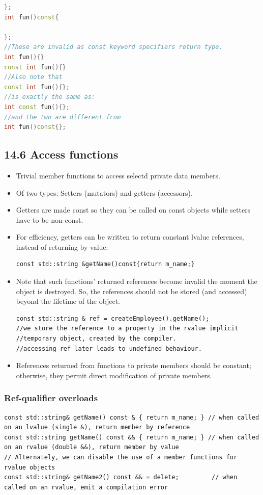 \documentclass{report}
\begin{document}
\begin{itemize}
\begin{lstlisting}[language=C++]
};
int fun()const{

};
//These are invalid as const keyword specifiers return type.
int fun(){}
const int fun(){}
//Also note that
const int fun(){};
//is exactly the same as:
int const fun(){};
//and the two are different from
int fun()const{};
\end{lstlisting}
\end{itemize}
\subsection{14.6 Access functions}
\begin{itemize}
\item Trivial member functions to access selectd private data members.
\item Of two types: Setters (mutators) and getters (accessors).
\item Getters are made const so they can be called on const objects while setters have to be non-const.
\item For efficiency, getters can be written to return constant lvalue references, instead of returning by value:
\begin{lstlisting}
const std::string &getName()const{return m_name;}
\end{lstlisting}
\item Note that such functions' returned references become invalid the moment the object is destroyed. So, the references should not be stored (and accessed) beyond the lifetime of the object.
\begin{lstlisting}
const std::string & ref = createEmployee().getName();
//we store the reference to a property in the rvalue implicit
//temporary object, created by the compiler.
//accessing ref later leads to undefined behaviour. 
\end{lstlisting}
\item References returned from functions to private members should be constant; otherwise, they permit direct modification of private members.
\end{itemize}
\subsubsection{Ref-qualifier overloads}
\begin{lstlisting}
const std::string& getName() const & { return m_name; } // when called on an lvalue (single &), return member by reference
const std::string getName() const && { return m_name; } // when called on an rvalue (double &&), return member by value
// Alternately, we can disable the use of a member functions for rvalue objects
const std::string& getName2() const && = delete;         // when called on an rvalue, emit a compilation error
\end{lstlisting}
\end{document}
